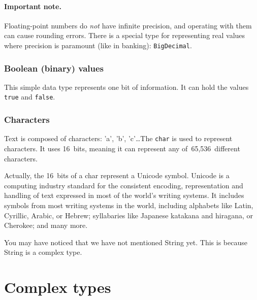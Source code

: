 \paragraph{Important note.} 

Floating-point numbers do \emph{not} have infinite precision, and
operating with them can cause rounding errors. There is a special type
for representing real values where precision is paramount (like in
banking): \verb+BigDecimal+. 

\subsubsection{Boolean (binary) values}
\label{sec:bool-binary-valu}

This simple data type represents one bit of information. It can hold
the values \verb+true+ and \verb+false+. 

\subsubsection{Characters}
\label{sec:characters}

Text is composed of characters: 'a', 'b', 'c'\ldots The \verb+char+ is
used to represent characters. It uses 16~bits, meaning it can
represent any of~65,536~different characters. 

Actually, the 16~bits of a char represent a Unicode symbol. Unicode is
a computing industry standard for the consistent encoding,
representation and handling of text expressed in most of the world's
writing systems. It includes symbols from most writing systems in
the world, including alphabets like Latin, Cyrillic, Arabic, or
Hebrew; syllabaries like Japanese katakana and hiragana, or
Cherokee; and many more. 

You may have noticed that we have not mentioned String yet. This is
because String is a complex type. 

\section{Complex types}
\label{sec:complex-types}




